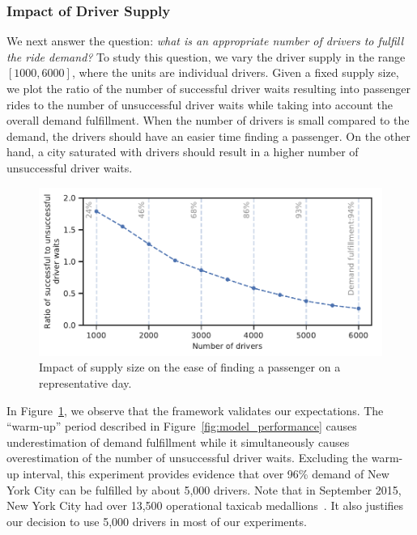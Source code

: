 \subsubsection{Impact of Driver Supply} 

We next answer the question: \textit{what is an appropriate number of drivers
    to fulfill the ride demand?}
To study this question, we vary the driver supply in the
    range $[1000, 6000]$, where the units are individual drivers. 
Given a fixed supply size, we plot the ratio of the number of successful driver 
    waits resulting into passenger rides to the number of unsuccessful driver 
    waits while taking into account the overall demand fulfillment.
When the number of drivers is small compared to the demand, the
    drivers should have an easier time finding a passenger. 
On the other hand, a city saturated with drivers should result in a 
    higher number of unsuccessful driver waits.
\begin{figure}
	\centering
	\includegraphics[scale=0.5]{figures/number_of_drivers_2.pdf}
	\caption{Impact of supply size on the ease of finding a
    passenger on a representative day.}
	\label{fig:number_of_drivers}
\end{figure}
In Figure~\ref{fig:number_of_drivers}, we observe that the framework validates
    our expectations.
The ``warm-up'' period described in Figure~\ref{fig:model_performance}
    causes underestimation of demand fulfillment while it simultaneously
    causes overestimation of 
    the number of unsuccessful driver waits. 
Excluding the warm-up interval, this experiment provides evidence that over 96\%
    demand of 
    New York City can be fulfilled by about 5,000 drivers. 
Note that in September 2015, New York City had over 
    13,500 operational taxicab medallions~\cite{wiki-001}. 
It also justifies our decision to use 5,000 drivers in most of our experiments. 


